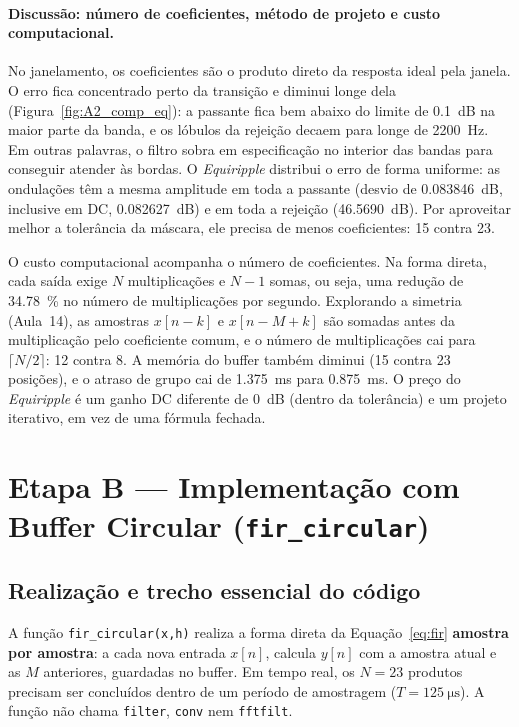 \documentclass[11pt,a4paper]{article}
\begin{document}
\paragraph{Discussão: número de coeficientes, método de projeto e custo computacional.}
No janelamento, os coeficientes são o produto direto da resposta ideal pela janela. O erro fica concentrado perto da transição e diminui longe dela (Figura~\ref{fig:A2_comp_eq}): a passante fica bem abaixo do limite de \SI{0,1}{dB} na maior parte da banda, e os lóbulos da rejeição decaem para longe de \SI{2200}{Hz}. Em outras palavras, o filtro sobra em especificação no interior das bandas para conseguir atender às bordas. O \textit{Equiripple} distribui o erro de forma uniforme: as ondulações têm a mesma amplitude em toda a passante (desvio de \SI{0,083846}{dB}, inclusive em DC, \SI{+0,082627}{dB}) e em toda a rejeição (\SI{46,5690}{dB}). Por aproveitar melhor a tolerância da máscara, ele precisa de menos coeficientes: 15 contra 23.

O custo computacional acompanha o número de coeficientes. Na forma direta, cada saída exige $N$ multiplicações e $N - 1$ somas, ou seja, uma redução de \SI{34,78}{\percent} no número de multiplicações por segundo. Explorando a simetria (Aula~14), as amostras $x[n-k]$ e $x[n-M+k]$ são somadas antes da multiplicação pelo coeficiente comum, e o número de multiplicações cai para $\lceil N/2 \rceil$: 12 contra 8. A memória do buffer também diminui (15 contra 23 posições), e o atraso de grupo cai de \SI{1,375}{ms} para \SI{0,875}{ms}. O preço do \textit{Equiripple} é um ganho DC diferente de \SI{0}{dB} (dentro da tolerância) e um projeto iterativo, em vez de uma fórmula fechada.

\section{Etapa B — Implementação com Buffer Circular (\texttt{fir\_circular})}

\subsection{Realização e trecho essencial do código}

A função \texttt{fir\_circular(x,h)} realiza a forma direta da Equação~\eqref{eq:fir} \textbf{amostra por amostra}: a cada nova entrada $x[n]$, calcula $y[n]$ com a amostra atual e as $M$ anteriores, guardadas no buffer. Em tempo real, os $N = 23$ produtos precisam ser concluídos dentro de um período de amostragem ($T = \SI{125}{\micro\second}$). A função não chama \texttt{filter}, \texttt{conv} nem \texttt{fftfilt}.
\end{document}
